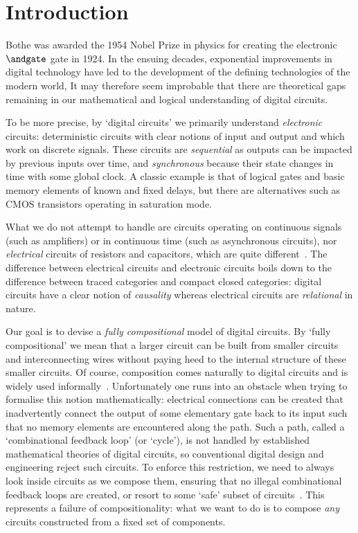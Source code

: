\documentclass{lmcs}
\begin{document}
\section{Introduction}

Bothe was awarded the 1954 Nobel Prize in physics for creating the electronic
\(\andgate\) gate in 1924.
In the ensuing decades, exponential improvements in digital technology have led
to the development of the defining technologies of the modern world,
It may therefore seem improbable that there are theoretical gaps remaining in
our mathematical and logical understanding of digital circuits.

To be more precise, by `digital circuits' we primarily understand
\emph{electronic} circuits: deterministic circuits with clear notions of
input and output and which work on discrete signals.
These circuits are \emph{sequential} as outputs can be impacted by previous
inputs over time, and \emph{synchronous} because their state changes in time
with some global clock.
A classic example is that of logical gates and basic memory elements of known
and fixed delays, but there are alternatives such as CMOS transistors operating
in saturation mode.

What we do not attempt to handle are circuits operating on continuous signals
(such as amplifiers) or in continuous time (such as asynchronous circuits), nor
\emph{electrical} circuits of resistors and capacitors, which are quite
different~\cite{boisseau2022string}.
The difference between electrical circuits and electronic circuits boils down to
the difference between traced categories and compact closed categories: digital
circuits have a clear notion of \emph{causality} whereas electrical circuits are
\emph{relational} in nature.

Our goal is to devise a \emph{fully compositional} model of digital circuits.
By `fully compositional' we mean that a larger circuit can be built from smaller
circuits and interconnecting wires without paying heed to the internal structure
of these smaller circuits.
Of course, composition comes naturally to digital circuits and is widely used
informally~\cite{gordon1982model}.
Unfortunately one runs into an obstacle when trying to formalise this notion
mathematically: electrical connections can be created that inadvertently
connect the output of some elementary gate back to
its input such that no memory elements are encountered along the path.
Such a path, called a `combinational feedback loop' (or `cycle'), is not handled
by established mathematical theories of digital circuits, so conventional
digital design and engineering reject such circuits.
To enforce this restriction, we need to always look inside circuits as we
compose them, ensuring that no illegal combinational feedback loops are created,
or resort to some `safe' subset of circuits~\cite{christensen2021wire}.
This represents a failure of compositionality: what we want to do is to compose
\emph{any} circuits constructed from a fixed set of components.
\end{document}
